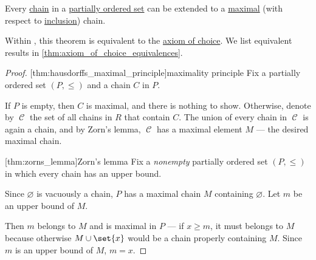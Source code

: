 \begin{theorem}\label{thm:hausdorffs_maximal_principle}
  Every \hyperref[def:partial_order_connectedness/chain]{chain} in a \hyperref[def:partially_ordered_set]{partially ordered set} can be extended to a \hyperref[def:extremal_points/maximal_and_minimal_element]{maximal} (with respect to \hyperref[def:inclusion_order]{inclusion}) chain.
\end{theorem}
\begin{comments}
  \item Within \hyperref[def:zfc]{}, this theorem is equivalent to the \hyperref[def:zfc/choice]{axiom of choice}. We list equivalent results in \cref{thm:axiom_of_choice_equivalences}.
\end{comments}
\begin{proof}
  [thm:hausdorffs_maximal_principle]{maximality principle} Fix a partially ordered set \( (P, \leq) \) and a chain \( C \) in \( P \).

  If \( P \) is empty, then \( C \) is maximal, and there is nothing to show. Otherwise, denote by \( \mscrC \) the set of all chains in \( R \) that contain \( C \). The union of every chain in \( \mscrC \) is again a chain, and by Zorn's lemma, \( \mscrC \) has a maximal element \( M \) --- the desired maximal chain.

  [thm:zorns_lemma]{Zorn's lemma} Fix a \emph{nonempty} partially ordered set \( (P, \leq) \) in which every chain has an upper bound.

  Since \( \varnothing \) is vacuously a chain, \( P \) has a maximal chain \( M \) containing \( \varnothing \). Let \( m \) be an upper bound of \( M \).

  Then \( m \) belongs to \( M \) and is maximal in \( P \) --- if \( x \geq m \), it must belongs to \( M \) because otherwise \( M \cup \set{ x } \) would be a chain properly containing \( M \). Since \( m \) is an upper bound of \( M \), \( m = x \).
\end{proof}
